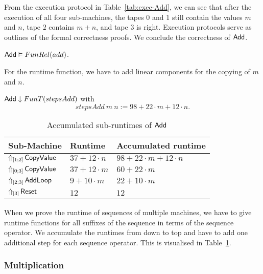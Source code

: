 From the execution protocol in Table~\ref{tab:exec-Add}, we can see that after the execution of all four sub-machines, the tapes $0$ and $1$ still
contain the values $m$ and $n$, tape $2$ contains $m+n$, and tape $3$ is right.  Execution protocols serve as outlines of the formal correctness
proofs.  We conclude the correctness of $\MS{Add}$.
\begin{lemma}
  \label{lem:Add_Computes}
  $\MS{Add} \Realise FunRel(add)$.
\end{lemma}

For the runtime function, we have to add linear components for the copying of $m$ and $n$.
\begin{lemma}
  $\MS{Add} \downarrow FunT(stepsAdd)$ with
  \[
    stepsAdd~m~n := 98 + 22 \cdot m + 12 \cdot n.
  \]
\end{lemma}

\begin{table}[h]
  \centering
  \begin{tabular}{|l|l|l|}
    \hline Sub-Machine & Runtime & Accumulated runtime \\ \hline\hline
    $\LiftTapes{\MS{CopyValue}}{\Vector{1;2}}$  & $37 + 12 \cdot n$ & $98 + 22 \cdot m + 12 \cdot n$ \\ \hline
    $\LiftTapes{\MS{CopyValue}}{\Vector{0;3}}$  & $37 + 12 \cdot m$ & $60 + 22 \cdot m$ \\ \hline
    $\LiftTapes{\MS{AddLoop}}{\Vector{2;3}}$    & $9 + 10 \cdot m$  & $22 + 10 \cdot m$ \\ \hline
    $\LiftTapes{\MS{Reset}}{\Vector{3}}$        & $12$              & $12$ \\ \hline
  \end{tabular}
  \caption{Accumulated sub-runtimes of $\MS{Add}$}
  \label{tab:runtime-Add}
\end{table}

When we prove the runtime of sequences of multiple machines, we have to give runtime functions for all suffixes of the sequence in terms of the
sequence operator.  We accumulate the runtimes from down to top and have to add one additional step for each sequence operator.  This is visualised in
Table~\ref{tab:runtime-Add}.


\subsubsection{Multiplication}
\label{sec:Mult}



